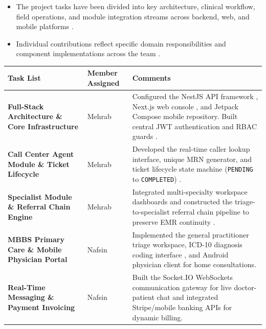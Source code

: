 \documentclass[lettersize,onecolumn,journal]{IEEEtran}
\begin{document}
	\begin{itemize}
		\item The project tasks have been divided into key architecture, clinical workflow, field operations, and module integration streams across backend, web, and mobile platforms \cite{srs2026, nestjs_framework, nextjs_app_router}.
		\item Individual contributions reflect specific domain responsibilities and component implementations across the team \cite{srs2026, accv2016}.
	\end{itemize}
	
	\begin{table}[htbp]
		\centering
		\small
		\renewcommand{\arraystretch}{1.45} 
		\begin{tabular}{>{\RaggedRight\arraybackslash}p{4.0cm} >{\RaggedRight\arraybackslash}p{2.5cm} >{\RaggedRight\arraybackslash}p{7.5cm}}
			\toprule
			\textbf{Task List} & \textbf{Member Assigned} & \textbf{Comments} \\
			\midrule
			\textbf{Full-Stack Architecture \& Core Infrastructure} & Mehrab & Configured the NestJS API framework \cite{nestjs_framework}, Next.js web console \cite{nextjs_app_router}, and Jetpack Compose mobile repository. Built central JWT authentication and RBAC guards \cite{rbac_standard}. \\
			
			\textbf{Call Center Agent Module \& Ticket Lifecycle} & Mehrab & Developed the real-time caller lookup interface, unique MRN generator, and ticket lifecycle state machine (\texttt{PENDING} to \texttt{COMPLETED}) \cite{srs2026}. \\
			
			\textbf{Specialist Module \& Referral Chain Engine} & Mehrab & Integrated multi-specialty workspace dashboards and constructed the triage-to-specialist referral chain pipeline to preserve EMR continuity \cite{srs2026, accv2016}. \\
			
			\textbf{MBBS Primary Care \& Mobile Physician Portal} & Nafsin & Implemented the general practitioner triage workspace, ICD-10 diagnosis coding interface \cite{who2016icd10}, and Android physician client for home consultations. \\
			
			\textbf{Real-Time Messaging \& Payment Invoicing} & Nafsin & Built the Socket.IO WebSockets communication gateway \cite{fette2011websocket} for live doctor-patient chat and integrated Stripe/mobile banking APIs \cite{stripe2024api} for dynamic billing. \\
			

\end{tabular}
\end{table}
\end{document}
